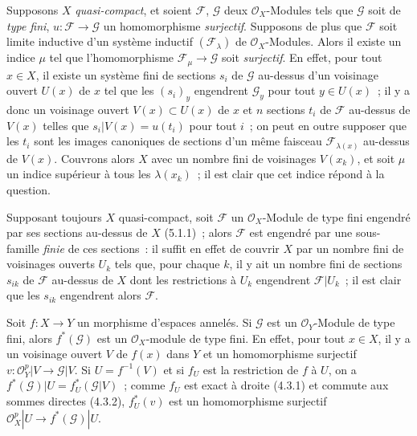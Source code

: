 \begin{env}[5.2.3]
\label{0.5.2.3-fr}
Supposons $X$ \emph{quasi-compact}, et soient $\mathcal{F}$, $\mathcal{G}$ deux
$\mathcal{O}_X$-Modules tels que $\mathcal{G}$ soit de \emph{type fini},
$u:\mathcal{F}\to\mathcal{G}$ un homomorphisme \emph{surjectif}. Supposons de
plus que $\mathcal{F}$ soit limite inductive d'un système inductif
$(\mathcal{F}_\lambda)$ de $\mathcal{O}_X$-Modules. Alors il existe un indice
$\mu$ tel que l'homomorphisme $\mathcal{F}_\mu\to\mathcal{G}$ soit
\emph{surjectif}. En effet, pour tout $x\in X$, il existe un système fini de
sections $s_i$ de $\mathcal{G}$ au-dessus d'un voisinage ouvert $U(x)$ de $x$
tel que les $(s_i)_y$ engendrent $\mathcal{G}_y$ pour tout $y\in U(x)$~; il y
a donc un voisinage ouvert $V(x)\subset U(x)$ de $x$ et $n$ sections $t_i$ de
$\mathcal{F}$ au-dessus de $V(x)$ telles que
$s_i|V(x)=u(t_i)$ pour tout $i$~; on peut en outre supposer que les $t_i$ sont
les images canoniques de sections d'un même faisceau
$\mathcal{F}_{\lambda(x)}$ au-dessus de $V(x)$. Couvrons alors $X$ avec un
nombre fini de voisinages $V(x_k)$, et soit $\mu$ un indice supérieur à tous
les $\lambda(x_k)$~; il est clair que cet indice répond à la question.

Supposant toujours $X$ quasi-compact, soit $\mathcal{F}$ un
$\mathcal{O}_X$-Module de type fini engendré par ses sections au-dessus de $X$
(5.1.1)~; alors $\mathcal{F}$ est engendré par une sous-famille \emph{finie}
de ces sections~: il suffit en effet de couvrir $X$ par un nombre fini de
voisinages ouverts $U_k$ tels que, pour chaque $k$, il y ait un nombre fini de
sections $s_{ik}$ de $\mathcal{F}$ au-dessus de $X$ dont les restrictions à
$U_k$ engendrent $\mathcal{F}|U_k$~; il est clair que les $s_{ik}$ engendrent
alors $\mathcal{F}$.
\end{env}

\begin{env}[5.2.4]
\label{0.5.2.4-fr}
Soit $f:X\to Y$ un morphisme d'espaces annelés. Si $\mathcal{G}$ est un
$\mathcal{O}_Y$-Module de type fini, alors $f^*(\mathcal{G})$ est un
$\mathcal{O}_X$-module de type fini. En effet, pour tout $x\in X$, il y a un
voisinage ouvert $V$ de $f(x)$ dans $Y$ et un homomorphisme surjectif
$v:\mathcal{O}_Y^p|V\to\mathcal{G}|V$. Si $U=f^{-1}(V)$ et si $f_U$ est la
restriction de $f$ à $U$, on a
$f^*(\mathcal{G})|U=f_U^*(\mathcal{G}|V)$~; comme $f_U$ est exact à droite
(4.3.1) et commute aux sommes directes (4.3.2), $f_U^*(v)$ est un
homomorphisme surjectif
$\mathcal{O}_X^p|U\to f^*(\mathcal{G})|U$.
\end{env}

